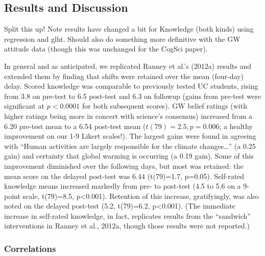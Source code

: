 \subsection{Results and Discussion} 

Split this up! Note results have changed a bit for Knowledge (both kinds) using
regression and glht. Should also do something more definitive with the GW
attitude data (though this was unchanged for the CogSci paper).

In general and as anticipated, we replicated Ranney et
al.’s (2012a) results and extended them by finding that shifts were retained
over the mean (four-day) delay. 
Scored knowledge was comparable to previously
tested UC students, rising from 3.8 on pre-test to 6.5 post-test and 6.3 on
followup (gains from pre-test were significant at $p<0.0001$ for both subsequent
scores). GW belief ratings (with higher ratings being
more in concert with science’s consensus) increased from a 6.20 pre-test mean to
a 6.54 post-test mean ($t(79)=2.5, p=0.006$; a healthy improvement on our 1-9
Likert scales!). The largest gains were found in agreeing with ``Human activities
are largely responsible for the climate changes\ldots'' (a 0.25 gain) and certainty
that global warming is occurring (a 0.19 gain). 
Some of this improvement
diminished over the following days, but most was retained: the mean score on the
delayed post-test was 6.44 (t(79)=1.7, p=0.05). Self-rated knowledge means
increased markedly from pre- to post-test (4.5 to 5.6 on a 9-point scale,
t(79)=8.5, p<0.001). Retention of this increase, gratifyingly, was also noted on
the delayed post-test (5.2, t(79)=6.2, p<0.001). (The immediate increase in
self-rated knowledge, in fact, replicates results from the ``sandwich''
interventions in Ranney et al., 2012a, though those results were not reported.)


\subsubsection{Correlations}

